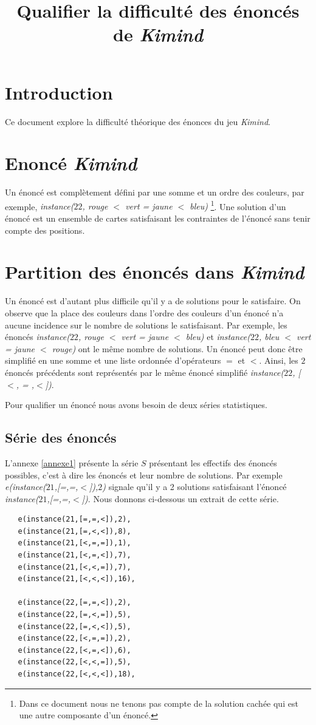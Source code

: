 \documentclass[a4paper, 12]{article}
\begin{document}
\title{Qualifier la difficulté des énoncés de \emph{Kimind}}
\date{}
\maketitle

\section{Introduction}
Ce document explore la difficulté théorique des énonces du jeu \emph{Kimind}.

\section{Enoncé \emph{Kimind}}
Un énoncé est complètement défini par une somme et un ordre des couleurs, par exemple, \emph{instance($22$, rouge $<$ vert = jaune $<$ bleu)} \footnote{Dans ce document nous ne tenons pas compte de la solution cachée qui est une autre composante d'un énoncé.}. Une solution d'un énoncé est un ensemble de cartes satisfaisant les contraintes de l'énoncé sans tenir compte des positions.


\section{Partition des énoncés dans \emph{Kimind}}

Un énoncé est d'autant plus difficile qu'il y a de solutions pour le satisfaire. 
On observe que la place des couleurs dans l’ordre des couleurs d’un énoncé n’a aucune incidence sur le nombre de solutions le satisfaisant.
Par exemple, les énoncés  \emph{instance($22$, rouge $<$ vert = jaune $<$ bleu)} et  \emph{instance($22$, bleu $<$ vert = jaune $<$ rouge)} ont le même nombre de solutions. Un énoncé peut donc être simplifié en une somme et une liste ordonnée d'opérateurs $=$ et $<$. Ainsi, les $2$ énoncés précédents sont représentés par le même énoncé simplifié \emph{instance($22$, [$<$, = ,$<$])}.

Pour qualifier un énoncé nous avons besoin de deux séries statistiques.

\subsection{Série des énoncés }

L'annexe \ref{annexe1} présente la série $S$ présentant les effectifs des énoncés possibles, c'est à dire les énoncés et leur nombre de solutions.
Par exemple \emph{e(instance($21$,[=,=,$<$]),$2$)} signale qu'il y a 2 solutions satisfaisant l'énoncé  \emph{instance($21$,[=,=,$<$])}.
Nous donnons ci-dessous un extrait de cette série.
\begin{verbatim}
   e(instance(21,[=,=,<]),2),
   e(instance(21,[=,<,<]),8),
   e(instance(21,[<,=,=]),1),
   e(instance(21,[<,=,<]),7),
   e(instance(21,[<,<,=]),7),
   e(instance(21,[<,<,<]),16),
   
   e(instance(22,[=,=,<]),2),
   e(instance(22,[=,<,=]),5),
   e(instance(22,[=,<,<]),5),
   e(instance(22,[<,=,=]),2),
   e(instance(22,[<,=,<]),6),
   e(instance(22,[<,<,=]),5),
   e(instance(22,[<,<,<]),18),
\end{verbatim}
\end{document}
